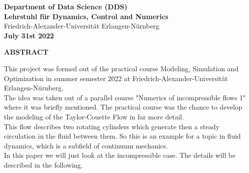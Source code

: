 \documentclass[12pt,a4paper]{report}
\begin{document}
\begin{center}
\textbf{Department of Data Science (DDS)} \\
\textbf{Lehrstuhl für Dynamics, Control and Numerics} \\

Friedrich-Alexander-Universität Erlangen-Nürnberg\\

\textbf{July 31st 2022}\\
\end{center}

\thispagestyle{empty}

\newpage



\newpage




\begin{center}


\end{center}
\begin{center}
 \textbf{ABSTRACT}
\end{center}

\vspace{0.8cm}

This project was formed out of the practical course Modeling, Simulation and Optimization in summer semester 2022 at Friedrich-Alexander-Universität Erlangen-Nürnberg.\\
The idea was taken out of a parallel course "Numerics of incompressible flows 1" \cite{NumFlow} where it was briefly mentioned. The practical course was the chance to develop the modeling of the Taylor-Couette Flow in far more detail.\\

This flow describes two rotating cylinders which generate then a steady circulation in the fluid between them.
So this is an example for a topic in fluid dynamics, which is a subfield of continuum mechanics. \\
In this paper we will just look at the incompressible case. The details will be described in the following.

\newpage

\tableofcontents
\newpage

\listoffigures
\end{document}
